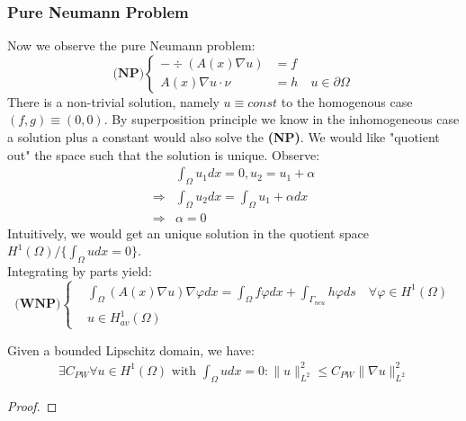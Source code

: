 \subsubsection{Pure Neumann Problem}
Now we observe the pure Neumann problem:
\begin{equation}
\textbf{(NP)}\left\{
\begin{aligned}
	-\div(A(x)\nabla u) &= f\\
	A(x)\nabla u \cdot \nu &= h \quad u \in \partial\Omega 
\end{aligned}	
\right.
\end{equation}
There is a non-trivial solution, namely $u \equiv const$ to the homogenous case $(f, g) \equiv (0, 0)$. By superposition principle we know in the inhomogeneous case a solution plus a constant would also solve the \textbf{(NP)}. We would like "quotient out" the space such that the solution is unique. Observe:
\begin{align*}
	&\int_\Omega u_1 dx = 0, u_2 = u_1 + \alpha\\
	\Rightarrow &\int_\Omega u_2 dx = \int_\Omega u_1 + \alpha dx\\
	\Rightarrow &\alpha = 0
\end{align*}
Intuitively, we would get an unique solution in the quotient space $H^1(\Omega)/ \{\int_\Omega u dx = 0\}$. \\
Integrating by parts yield:
\begin{equation}
\textbf{(WNP)}\left\{
\begin{aligned}
	&\int_\Omega (A(x) \nabla u) \nabla\varphi dx = \int_\Omega f\varphi dx + \int_{\Gamma_{neu}}h \varphi ds \quad \forall \varphi \in H^1(\Omega) \\
	& u \in H_{av}^1(\Omega)
\end{aligned}	
\right.
\end{equation}

\begin{proposition}
	Given a bounded Lipschitz domain, we have: 
	\begin{align*}
		\exists C_{PW} \forall u \in H^1(\Omega)\text{ with } \int_\Omega u dx = 0: \|u\|_{L^2}^2 \leq C_{PW} \|\nabla u\|_{L^2}^2
	\end{align*}
\end{proposition}
\begin{proof}
	
\end{proof}


